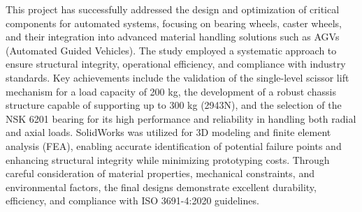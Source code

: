 \documentclass[main]{subfiles}
\begin{document}



This project has successfully addressed the design and optimization of critical components for automated systems, focusing on bearing wheels, caster wheels, and their integration into advanced material handling solutions such as AGVs (Automated Guided Vehicles). The study employed a systematic approach to ensure structural integrity, operational efficiency, and compliance with industry standards. Key achievements include the validation of the single-level scissor lift mechanism for a load capacity of 200 kg, the development of a robust chassis structure capable of supporting up to 300 kg (2943N), and the selection of the NSK 6201 bearing for its high performance and reliability in handling both radial and axial loads. SolidWorks was utilized for 3D modeling and finite element analysis (FEA), enabling accurate identification of potential failure points and enhancing structural integrity while minimizing prototyping costs. Through careful consideration of material properties, mechanical constraints, and environmental factors, the final designs demonstrate excellent durability, efficiency, and compliance with ISO 3691-4:2020 guidelines.
\end{document}
